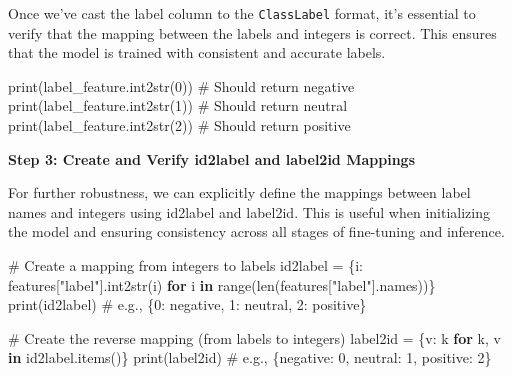 \documentclass[
  letterpaper,
  DIV=11,
  numbers=noendperiod]{scrreprt}
\newenvironment{Shaded}{\begin{snugshade}}{\end{snugshade}}
\newcommand{\BuiltInTok}[1]{\textcolor[rgb]{0.00,0.23,0.31}{#1}}
\newcommand{\CommentTok}[1]{\textcolor[rgb]{0.37,0.37,0.37}{#1}}
\newcommand{\ControlFlowTok}[1]{\textcolor[rgb]{0.00,0.23,0.31}{\textbf{#1}}}
\newcommand{\DecValTok}[1]{\textcolor[rgb]{0.68,0.00,0.00}{#1}}
\newcommand{\KeywordTok}[1]{\textcolor[rgb]{0.00,0.23,0.31}{\textbf{#1}}}
\newcommand{\NormalTok}[1]{\textcolor[rgb]{0.00,0.23,0.31}{#1}}
\newcommand{\OperatorTok}[1]{\textcolor[rgb]{0.37,0.37,0.37}{#1}}
\newcommand{\StringTok}[1]{\textcolor[rgb]{0.13,0.47,0.30}{#1}}
\begin{document}
Once we've cast the label column to the \texttt{ClassLabel} format, it's
essential to verify that the mapping between the labels and integers is
correct. This ensures that the model is trained with consistent and
accurate labels.

\begin{Shaded}
\begin{Highlighting}[]
\BuiltInTok{print}\NormalTok{(label\_feature.int2str(}\DecValTok{0}\NormalTok{))  }\CommentTok{\# Should return \textquotesingle{}negative\textquotesingle{}}
\BuiltInTok{print}\NormalTok{(label\_feature.int2str(}\DecValTok{1}\NormalTok{))  }\CommentTok{\# Should return \textquotesingle{}neutral\textquotesingle{}}
\BuiltInTok{print}\NormalTok{(label\_feature.int2str(}\DecValTok{2}\NormalTok{))  }\CommentTok{\# Should return \textquotesingle{}positive\textquotesingle{}}
\end{Highlighting}
\end{Shaded}

\textbf{Step 3: Create and Verify id2label and label2id Mappings}

For further robustness, we can explicitly define the mappings between
label names and integers using id2label and label2id. This is useful
when initializing the model and ensuring consistency across all stages
of fine-tuning and inference.

\begin{Shaded}
\begin{Highlighting}[]
\CommentTok{\# Create a mapping from integers to labels}
\NormalTok{id2label }\OperatorTok{=}\NormalTok{ \{i: features[}\StringTok{"label"}\NormalTok{].int2str(i) }\ControlFlowTok{for}\NormalTok{ i }\KeywordTok{in} \BuiltInTok{range}\NormalTok{(}\BuiltInTok{len}\NormalTok{(features[}\StringTok{"label"}\NormalTok{].names))\}}
\BuiltInTok{print}\NormalTok{(id2label)  }\CommentTok{\# e.g., \{0: \textquotesingle{}negative\textquotesingle{}, 1: \textquotesingle{}neutral\textquotesingle{}, 2: \textquotesingle{}positive\textquotesingle{}\}}

\CommentTok{\# Create the reverse mapping (from labels to integers)}
\NormalTok{label2id }\OperatorTok{=}\NormalTok{ \{v: k }\ControlFlowTok{for}\NormalTok{ k, v }\KeywordTok{in}\NormalTok{ id2label.items()\}}
\BuiltInTok{print}\NormalTok{(label2id)  }\CommentTok{\# e.g., \{\textquotesingle{}negative\textquotesingle{}: 0, \textquotesingle{}neutral\textquotesingle{}: 1, \textquotesingle{}positive\textquotesingle{}: 2\}}
\end{Highlighting}
\end{Shaded}
\end{document}
